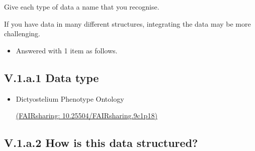 \documentclass[a4paper,12pt]{report}
\begin{document}
\noindent
\begin{markdown}
Give each type of data a name that you recognise.

If you have data in many different structures, integrating the data may be more challenging.
\end{markdown}


\begin{itemize}
  \item[\ArrowBoldDownRight] Answered with 1 item as follows.
\end{itemize}%
\subsection*{\protect\textcolor{colorSecId}{V.1.a.1} Data type}

\label{83438863-0aa0-4458-b14b-2b2c0d4f811d.a797cab9-0829-4787-a096-1b5cedc9147f.a209985f-1de5-4c5d-a741-f5f6775499bd.63ed4349-9743-4fd1-96df-73dbb7e4f05b}






\begin{itemize}
  \item[\CheckmarkBold]
  \begin{markdown}
  Dictyostelium Phenotype Ontology
  \end{markdown}
  \href{https://fairsharing.org/10.25504/FAIRsharing.9c1p18}{(FAIRsharing: 10.25504/FAIRsharing.9c1p18)}
  
\end{itemize}


\subsection*{\protect\textcolor{colorSecId}{V.1.a.2} How is this data structured?}

\label{83438863-0aa0-4458-b14b-2b2c0d4f811d.a797cab9-0829-4787-a096-1b5cedc9147f.a209985f-1de5-4c5d-a741-f5f6775499bd.87fe7235-0a0f-4788-8f44-04523461655f}
\end{document}
